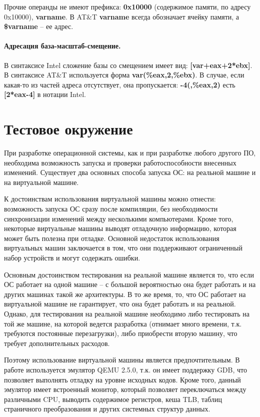 Прочие операнды не имеют префикса: \textbf{0x10000} (содержимое памяти, по адресу 0x10000),
\textbf{varname}. В AT\&T \textbf{varname} всегда обозначает ячейку памяти, а \textbf{\$varname} --
ее адрес.

\paragraph{Адресация база-масштаб-смещение.} В синтаксисе Intel сложение базы со смещением
имеет вид: \textbf{[var+eax+2*ebx]}. В синтаксисе AT\&T используется форма \textbf{var(\%eax,2,\%ebx)}. В случае, если какая-то
из частей адреса отсутствует, она пропускается: \textbf{-4(,\%eax,2)} есть \textbf{[2*eax-4]} в нотации Intel.

\section{Тестовое окружение}
При разработке операционной системы, как и при разработке любого другого ПО,
необходима возможность запуска и проверки работоспособности внесенных изменений.
Существует два основных способа запуска ОС: на реальной машине
и на виртуальной машине.

К достоинствам использования виртуальной машины можно отнести: возможность
запуска ОС сразу после компиляции, без необходимости синхронизации изменений
между несколькими компьютерами. Кроме того, некоторые виртуальные машины выводят
отладочную информацию, которая может быть полезна при отладке. Основной недостаток
использования виртуальных машин заключается в том, что они поддерживают ограниченный
набор устройств и могут содержать ошибки.

Основным достоинством тестирования на реальной машине является то, что если
ОС работает на одной машине -- с большой вероятностью она будет работать и
на других машинах такой же архитектуры. В то же время, то, что ОС работает
на виртуальной машине не гарантирует, что она будет работать и на реальной.
Однако, для тестирования на реальной машине необходимо либо тестировать на
той же машине, на которой ведется разработка (отнимает много времени, т.к.
требуются постоянные перезагрузки), либо приобрести вторую машину, что требует
дополнительных расходов.

Поэтому использование виртуальной машины является предпочтительным. В работе используется
эмулятор QEMU 2.5.0, т.к. он имеет поддержку GDB, что позволяет
выполнять отладку на уровне исходных кодов. Кроме того, данный эмулятор имеет встроенный
монитор, который позволяет переключаться между различными CPU, выводить содержимое
регистров, кеша TLB, таблиц страничного преобразования и других системных структур данных.


